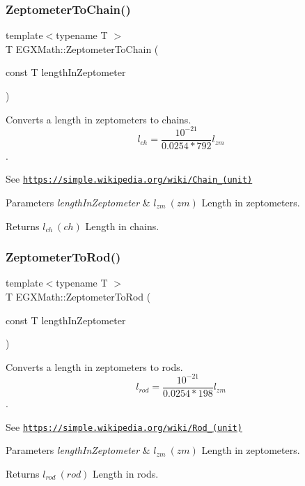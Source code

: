 \subsubsection{\texorpdfstring{Zeptometer\+To\+Chain()}{ZeptometerToChain()}}
{\footnotesize\ttfamily template$<$typename T $>$ \\
T E\+G\+X\+Math\+::\+Zeptometer\+To\+Chain (\begin{DoxyParamCaption}\item[{const T}]{length\+In\+Zeptometer }\end{DoxyParamCaption})}



Converts a length in zeptometers to chains. \[ l_{ch}= \frac{10^{-21}}{0.0254 * 792} l_{zm} \]. 

See \href{https://simple.wikipedia.org/wiki/Chain_(unit)}{\tt https\+://simple.\+wikipedia.\+org/wiki/\+Chain\+\_\+(unit)} 
\begin{DoxyParams}{Parameters}
{\em length\+In\+Zeptometer} & $ l_{zm}\ (zm)$ Length in zeptometers. \\
\hline
\end{DoxyParams}
\begin{DoxyReturn}{Returns}
$ l_{ch}\ (ch)$ Length in chains. 
\end{DoxyReturn}
\mbox{\label{group___e_g_x_math-_conversions-_length_conversions-_s_i-_zeptometer-_surveyors_gac0c6193e55739ec7f4c3769ebddb65e2}} 
\subsubsection{\texorpdfstring{Zeptometer\+To\+Rod()}{ZeptometerToRod()}}
{\footnotesize\ttfamily template$<$typename T $>$ \\
T E\+G\+X\+Math\+::\+Zeptometer\+To\+Rod (\begin{DoxyParamCaption}\item[{const T}]{length\+In\+Zeptometer }\end{DoxyParamCaption})}



Converts a length in zeptometers to rods. \[ l_{rod}= \frac{10^{-21}}{0.0254 * 198} l_{zm} \]. 

See \href{https://simple.wikipedia.org/wiki/Rod_(unit)}{\tt https\+://simple.\+wikipedia.\+org/wiki/\+Rod\+\_\+(unit)} 
\begin{DoxyParams}{Parameters}
{\em length\+In\+Zeptometer} & $ l_{zm}\ (zm)$ Length in zeptometers. \\
\hline
\end{DoxyParams}
\begin{DoxyReturn}{Returns}
$ l_{rod}\ (rod)$ Length in rods. 
\end{DoxyReturn}
